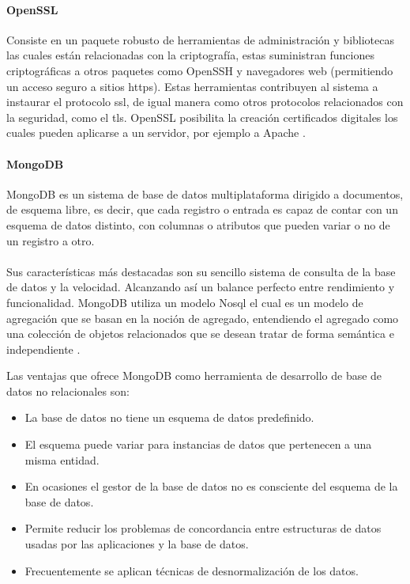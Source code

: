 \documentclass[12pt, a4paper, titlepage]{report}
\begin{document}
		    \paragraph{OpenSSL\\}
            
            Consiste en un paquete robusto de herramientas de administración y bibliotecas las cuales están relacionadas con la criptografía, estas suministran funciones criptográficas a otros paquetes como OpenSSH y navegadores web (permitiendo un acceso seguro a sitios \acrshort{https}). Estas herramientas contribuyen al sistema a instaurar el protocolo \acrfull{ssl}, de igual manera como otros protocolos relacionados con la seguridad, como el \acrfull{tls}. OpenSSL posibilita la creación certificados digitales los cuales pueden aplicarse a un servidor, por ejemplo a Apache \cite{refopenssl}.
      
            \paragraph{MongoDB \\}
            MongoDB es un sistema de base de datos multiplataforma dirigido a documentos, de esquema libre, es decir, que cada registro o entrada es capaz de contar con un esquema de datos distinto, con columnas o atributos que pueden variar o no de un registro a otro.\\\\
            Sus características más destacadas son su sencillo sistema de consulta de la base de datos y la velocidad. Alcanzando así un balance perfecto entre rendimiento y funcionalidad. 
            MongoDB utiliza un modelo No\acrshort{sql} el cual es un modelo de agregación que se basan en la noción de agregado, entendiendo el agregado como una colección de objetos relacionados que se desean tratar de forma semántica e independiente \cite{refMongoDB}.
            
            Las ventajas que ofrece MongoDB como herramienta de desarrollo de base de datos no relacionales son:
            \begin{itemize}
                \item La base de datos no tiene un esquema de datos predefinido.
                \item El esquema puede variar para instancias de datos que pertenecen a una misma entidad.
                \item En ocasiones el gestor de la base de datos no es consciente del esquema de la base de datos.
                \item Permite reducir los problemas de concordancia entre estructuras de datos usadas por las aplicaciones y la base de datos.
                \item Frecuentemente se aplican técnicas de desnormalización de los datos.
            \end{itemize}
                    
\end{document}
